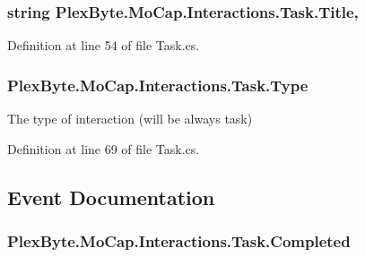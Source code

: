 \subsubsection[{\texorpdfstring{Title}{Title}}]{\setlength{\rightskip}{0pt plus 5cm}string Plex\+Byte.\+Mo\+Cap.\+Interactions.\+Task.\+Title\hspace{0.3cm}{\ttfamily [get]}, {\ttfamily [set]}}\hypertarget{class_plex_byte_1_1_mo_cap_1_1_interactions_1_1_task_afc2aa1b0a8699fe0a607b452eb5461c3}{}\label{class_plex_byte_1_1_mo_cap_1_1_interactions_1_1_task_afc2aa1b0a8699fe0a607b452eb5461c3}


Definition at line 54 of file Task.\+cs.

\subsubsection[{\texorpdfstring{Type}{Type}}]{ Plex\+Byte.\+Mo\+Cap.\+Interactions.\+Task.\+Type\hspace{0.3cm}{\ttfamily [get]}}\hypertarget{class_plex_byte_1_1_mo_cap_1_1_interactions_1_1_task_a8d56efe5c3efeb4df5f291cac8a57128}{}\label{class_plex_byte_1_1_mo_cap_1_1_interactions_1_1_task_a8d56efe5c3efeb4df5f291cac8a57128}


The type of interaction (will be always task) 



Definition at line 69 of file Task.\+cs.



\subsection{Event Documentation}
\subsubsection[{\texorpdfstring{Completed}{Completed}}]{ Plex\+Byte.\+Mo\+Cap.\+Interactions.\+Task.\+Completed}\hypertarget{class_plex_byte_1_1_mo_cap_1_1_interactions_1_1_task_a0d4c6a5a630e50b403c7e767d970206f}{}\label{class_plex_byte_1_1_mo_cap_1_1_interactions_1_1_task_a0d4c6a5a630e50b403c7e767d970206f}


